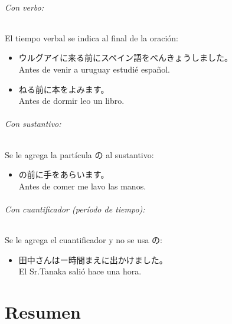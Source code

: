 \documentclass[a4paper,12pt,oneside]{report}
\begin{document}
\begin{CJK*}{UTF8}{min}
        \subparagraph{Con verbo:}

        El tiempo verbal se indica al final de la oraci\'on:

        \begin{itemize}
          \item ウルグアイに来る前にスペイン語をべんきょうしました。\\
                Antes de venir a uruguay estudi\'e español.
          \item ねる前に本をよみます。\\
                Antes de dormir leo un libro.
        \end{itemize}

        \subparagraph{Con sustantivo:}

        Se le agrega la part\'icula の al sustantivo:

        \begin{itemize}
          \item {}の前に手をあらいます。\\
                Antes de comer me lavo las manos.
        \end{itemize}

        \subparagraph{Con cuantificador (per\'iodo de tiempo):}

        Se le agrega el cuantificador y no se usa の:

        \begin{itemize}
          \item 田中さんはー時間まえに出かけました。\\
                El Sr.Tanaka sali\'o hace una hora.
        \end{itemize}


\chapter{Resumen}
  \thispagestyle{contenido} %
  \pagestyle{contenido}     %


\end{CJK*}
\end{document}
